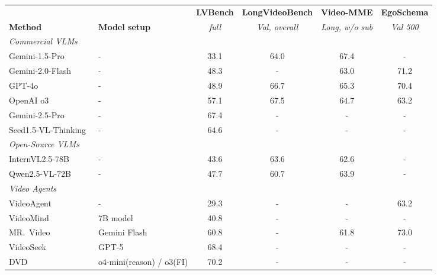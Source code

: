 \documentclass[11pt]{article}
\begin{document}
\begin{table}[!tb]
  \centering
  \small
  \setlength{\tabcolsep}{2.5pt}
  \begin{tabularx}{\textwidth}{@{}lXcccc@{}}
    \toprule
    & & \textbf{LVBench} & \textbf{LongVideoBench} & \textbf{Video-MME} & \textbf{EgoSchema} \\
    \textbf{Method} & \textbf{Model setup}
    & \textit{full}
    & \textit{Val, overall}
    & \textit{Long, w/o sub}
    & \textit{Val 500} \\
    \midrule
    \multicolumn{6}{l}{\textit{Commercial VLMs}} \\
    Gemini-1.5-Pro~\cite{gemini15}
      & -             & 33.1 & 64.0 & 67.4 & -   \\
    Gemini-2.0-Flash~\cite{gemini15}
      & -             & 48.3 & - & 63.0 & 71.2   \\
    GPT-4o~\cite{gpt4o}
      & -             & 48.9 & 66.7 & 65.3 & 70.4 \\
    OpenAI o3~\cite{o3}
      & -             & 57.1 & 67.5 & 64.7 & 63.2 \\
    Gemini-2.5-Pro~\cite{gemini25}
      & -             & 67.4 & -   & -   & -   \\
    Seed1.5-VL-Thinking~\cite{seed}
      & -             & 64.6 & - & -   & -   \\
    \midrule
    \multicolumn{6}{l}{\textit{Open-Source VLMs}} \\
    InternVL2.5-78B~\cite{internvl}
      & -             & 43.6 & 63.6 & 62.6  & -   \\
    Qwen2.5-VL-72B~\cite{qwen}
      & -             & 47.7 & 60.7 & 63.9 & -   \\
    \midrule
    \multicolumn{6}{l}{\textit{Video Agents}} \\
    VideoAgent~\cite{videoagent}
      & -            & 29.3 & -   & -   & 63.2 \\
    VideoMind~\cite{videomind}
      & 7B model      & 40.8 & -   & -   & -   \\
    MR.~Video~\cite{mrvideo}
      & Gemini Flash  & 60.8 & -   & 61.8 & 73.0 \\
    VideoSeek~\cite{videoseek}
      & GPT-5         & 68.4 & -   & -   & -   \\
    DVD~\cite{deepvideo2025}
      & o4-mini(reason) / o3(FI)        & 70.2 & -   & -   & -   \\

\end{tabularx}
\end{table}
\end{document}
